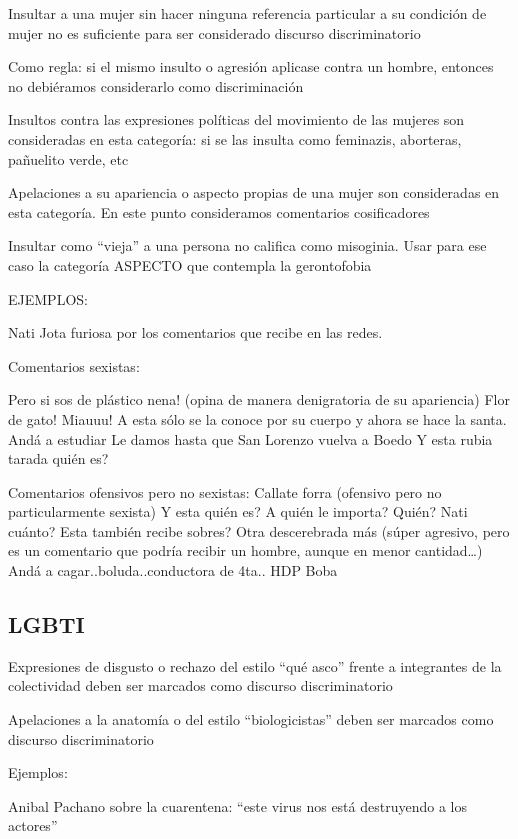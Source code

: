 Insultar a una mujer sin hacer ninguna referencia particular a su condición de mujer no es suficiente para ser considerado discurso discriminatorio

Como regla: si el mismo insulto o agresión aplicase contra un hombre, entonces no debiéramos considerarlo como discriminación


Insultos contra las expresiones políticas del movimiento de las mujeres son consideradas en esta categoría: si se las insulta como feminazis, aborteras, pañuelito verde, etc



Apelaciones a su apariencia o aspecto propias de una mujer son consideradas en esta categoría. En este punto consideramos comentarios cosificadores 


Insultar como “vieja” a una persona no califica como misoginia. Usar para ese caso la categoría ASPECTO que contempla la gerontofobia

EJEMPLOS: 

Nati Jota furiosa por los comentarios que recibe en las redes.

Comentarios sexistas:

Pero si sos de plástico nena! (opina de manera denigratoria de su apariencia)
Flor de gato!
Miauuu!
A esta sólo se la conoce por su cuerpo y ahora se hace la santa. Andá a estudiar
Le damos hasta que San Lorenzo vuelva a Boedo
Y esta rubia tarada quién es?



Comentarios ofensivos pero no sexistas:
Callate forra (ofensivo pero no particularmente sexista)
Y esta quién es? A quién le importa?
Quién?
Nati cuánto?
Esta también recibe sobres?
Otra descerebrada más (súper agresivo, pero es un comentario que podría recibir un hombre, aunque en menor cantidad…)
Andá a cagar..boluda..conductora de 4ta..
HDP
Boba



\subsection{LGBTI}

Expresiones de disgusto o rechazo del estilo “qué asco” frente a integrantes de la colectividad deben ser marcados como discurso discriminatorio


Apelaciones a la anatomía o del estilo “biologicistas” deben ser marcados como discurso discriminatorio


Ejemplos:

Anibal Pachano sobre la cuarentena: “este virus nos está destruyendo a los actores”


